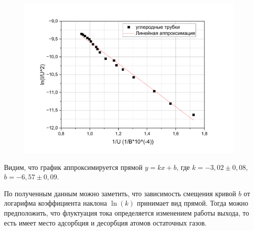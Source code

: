 \documentclass[12pt,a4paper]{article}
\begin{document}
\begin{figure}[H]
\centering
	\includegraphics[width=0.65\linewidth]{uglerod.pdf}
\end{figure}

Видим, что график аппроксимируется прямой $y = kx +b$, где $k = -3,02 \pm 0,08$, $b = -6,57 \pm 0,09$. 

По полученным данным можно заметить, что зависимость смещения кривой $b$ от логарифма коэффициента наклона $\ln(k)$ принимает вид прямой. Тогда можно предположить, что флуктуация тока определяется изменением работы выхода, то есть имеет место адсорбция и десорбция атомов остаточных газов. 
\end{document}
